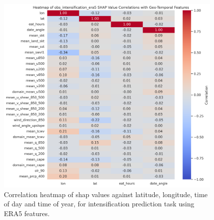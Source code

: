 \begin{figure}[ht]
    \centering
    \includegraphics[width=\textwidth]{../figures/generated/experiments/obs_intensification/obs_intensification_era5_shap_correlation_heatmap.png}
    \caption{Correlation heatmap of \acrshort{shap} values against latitude, longitude, time of day and time of year, for intensification prediction task using ERA5 features.}
    \label{fig:obs_intensification_era5_shap_heatmap}
\end{figure}

